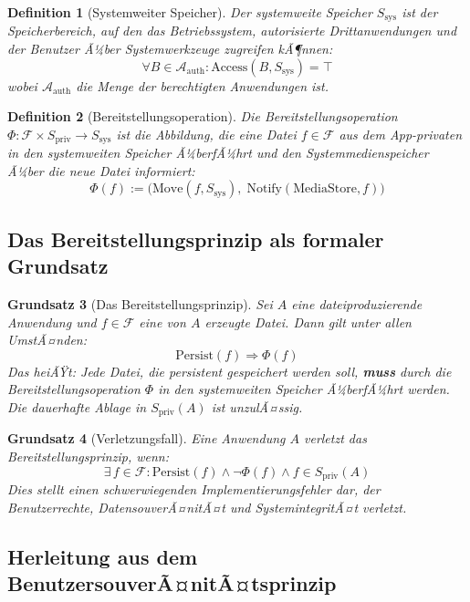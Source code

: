 ﻿\documentclass[12pt, a4paper]{article}
\newtheorem{definition}{Definition}[section]
\newtheorem{prinzip}[definition]{Grundsatz}
\begin{document}
\begin{definition}[Systemweiter Speicher]
\label{def:systemspeicher}
Der \emph{systemweite Speicher} $S_{\text{sys}}$ ist der Speicherbereich, auf den das
Betriebssystem, autorisierte Drittanwendungen und der Benutzer Ã¼ber
Systemwerkzeuge zugreifen kÃ¶nnen:
\[
  \forall B \in \mathcal{A}_{\text{auth}}: \text{Access}(B, S_{\text{sys}}) = \top
\]
wobei $\mathcal{A}_{\text{auth}}$ die Menge der berechtigten Anwendungen ist.
\end{definition}

\begin{definition}[Bereitstellungsoperation]
\label{def:bereitstellung}
Die \emph{Bereitstellungsoperation} $\Phi: \mathcal{F} \times S_{\text{priv}} \to S_{\text{sys}}$
ist die Abbildung, die eine Datei $f \in \mathcal{F}$ aus dem App-privaten in den
systemweiten Speicher Ã¼berfÃ¼hrt und den Systemmedienspeicher Ã¼ber die neue Datei
informiert:
\[
  \Phi(f) := \big( \text{Move}(f, S_{\text{sys}}),\; \text{Notify}(\text{MediaStore}, f) \big)
\]
\end{definition}

\subsection{Das Bereitstellungsprinzip als formaler Grundsatz}

\begin{prinzip}[Das Bereitstellungsprinzip]
\label{prinzip:bereitstellung}
Sei $A$ eine dateiproduzierende Anwendung und $f \in \mathcal{F}$ eine von $A$ erzeugte
Datei. Dann gilt unter allen UmstÃ¤nden:
\[
  \text{Persist}(f) \Rightarrow \Phi(f)
\]
Das heiÃŸt: Jede Datei, die persistent gespeichert werden soll, \textbf{muss} durch die
Bereitstellungsoperation $\Phi$ in den systemweiten Speicher Ã¼berfÃ¼hrt werden.
Die dauerhafte Ablage in $S_{\text{priv}}(A)$ ist unzulÃ¤ssig.
\end{prinzip}

\begin{prinzip}[Verletzungsfall]
\label{prinzip:verletzung}
Eine Anwendung $A$ verletzt das Bereitstellungsprinzip, wenn:
\[
  \exists\, f \in \mathcal{F}: \text{Persist}(f) \wedge \neg\Phi(f) \wedge f \in S_{\text{priv}}(A)
\]
Dies stellt einen schwerwiegenden Implementierungsfehler dar, der Benutzerrechte,
DatensouverÃ¤nitÃ¤t und SystemintegritÃ¤t verletzt.
\end{prinzip}

\subsection{Herleitung aus dem BenutzersouverÃ¤nitÃ¤tsprinzip}
\end{document}
